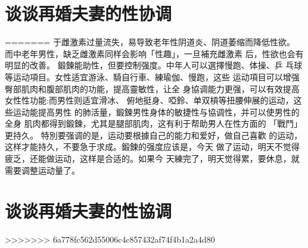 \documentclass[12pt,UTF8]{ctexbook}
\begin{document}
\section{谈谈再婚夫妻的性协调}
=======
于雌激素过量流失，易导致老年性阴道炎、阴道萎缩而降低性欲。
而中老年男性，缺乏雌激素同样会影响「性趣」，一旦補充雌激素
后，性欲也会有明显的改善。
鍛鍊能助性，但要控制强度。中年人可以選擇慢跑、体操、乒
乓球等运动項目。女性适宜游泳、騎自行車、練瑜伽、慢跑，这些
运动項目可以增强臀部肌肉和腹部肌肉的功能，提高靈敏性，让全
身協调能力更强，可以有效提高女性性功能:而男性则适宜滑冰、
俯地挺身、啞鈴、单双槓等扭腰伸展的运动，这些运动能提高男性
的肺活量，鍛鍊男性身体的敏捷性与協调性，并可以使男性的全身
肌肉都得到鍛鍊，尤其是腿部肌肉，这有利于帮助男人在性方面的
「戰鬥」更持久。
特別要强调的是，运动要根據自己的能力和爱好，做自己喜歡
的运动，这样才能持久，不要急于求成。鍛鍊的强度应该是，今天
做了运动，明天不觉得疲乏，还能做运动，这样是合适的。如果今
天練完了，明天觉得累，要休息，就需要调整运动量了。

\section{谈谈再婚夫妻的性協调}
>>>>>>> 6a778fc562d55006c4c857432af74f4b1a2a4d80
\end{document}
